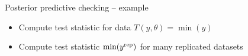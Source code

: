 \documentclass[aspectratio=169]{beamer}
\begin{document}
\begin{frame}[fragile]{Posterior predictive checking -- example}

  \begin{itemize}
  \item<1-> Compute test statistic for data $T(y,\theta)=\min(y)$
  \item<2-> Compute test statistic $\min(y^{\rm rep})$ for many replicated datasets 
  \end{itemize}
  \vspace{-1.5\baselineskip}

\end{frame}


\end{document}
